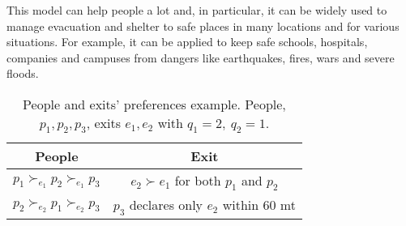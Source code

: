 This model can help people a lot and, in particular, it can be widely used to manage evacuation and shelter to safe places in many locations and for various situations. For example, it can be applied to keep safe schools, hospitals, companies and campuses from dangers like earthquakes, fires, wars and severe floods.

\begin{table}[!htb]
    \centering
    \begin{tabular}{c|c}
        \hline People & Exit \\
        \hline \(p_1 \succ_{e_1} p_2 \succ_{e_1} p_3\) & \(e_2 \succ e_1\) for both \(p_1\) and \(p_2\) \\
        \(p_2 \succ_{e_2} p_1 \succ_{e_2} p_3\) & \(p_3\) declares only \(e_2\) within 60 mt \\
        \hline
    \end{tabular}
    \vspace{-0.5em}
    \caption{People and exits' preferences example. People, \(p_1, p_2, p_3\), exits \(e_1, e_2\) with \( q_1 = 2, \ q_2 = 1\).}
    \label{tab:people-exit}
    \vspace{-1.5em}
\end{table}
